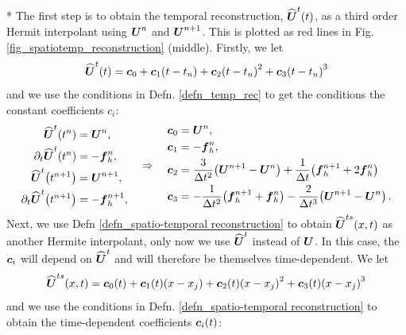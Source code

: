 \documentclass[final]{amsart}
\newcommand{\recgs}[1]{\widehat{\vec{#1}}}
\renewcommand{\vect}[1]{\geovec{#1}}
\renewcommand{\vec}[1]{\geovec{#1}}
\numberwithin{equation}{section}
\begin{document}
\/*
The first step is to obtain the temporal reconstruction,  $\widehat{\vect {U}}^t\qp{t}$, as a third order Hermit interpolant using  $\vect {U}^n$ and $\vect {U}^{n+1}$.  This is plotted as red lines in  Fig. \ref{fig_spatiotemp_reconstruction} (middle).  Firstly, we let
\begin{equation}
\widehat{\vect U}^t\qp{t}=\vect{c}_0 +\vect{c}_1\qp{t-t_n}+\vect{c}_2\qp{t-t_n}^2+\vect{c}_3\qp{t-t_n}^3
\end{equation}
and we use the conditions in Defn. \ref{defn_temp_rec}  to get the conditions the constant coefficients $c_i$:
\begin{equation}
\begin{aligned}
\recgs{U}^t\qp{t^n} &=\vect{U}^n,\\
\partial_t \widehat{\vect U}^t\qp{t^n}&=-\vect{f}^n_h,\\
\widehat{\vect U}^t\qp{t^{n+1}} &=\vect{U}^{n+1},\\
\partial_t \widehat{\vect U}^t\qp{t^{n+1}}&=-\vect{f}^{n+1}_h,
\end{aligned}\quad
\Rightarrow \quad 
\begin{aligned}
\vect{c}_0&=\vect U^n,\\
\vect{c}_1&=-\vect{f}_h^n,\\
\vect{c}_2&=\frac{3}{\Delta t^2}\qp{\vect U^{n+1}-\vect U^n}+\frac{1}{\Delta t}\qp{\vect{f}^{n+1}_h+2\vect{f}^n_h}\\
\vect{c}_3&=-\frac{1}{\Delta t^2}\qp{\vect{f}^{n+1}_h+\vect{f}^n_h}-\frac{2}{\Delta t^3}\qp{\vect U^{n+1}-\vect U^n}.\\
\end{aligned}
\end{equation}
Next, we use Defn  \ref{defn_spatio-temporal reconstruction} to obtain $\widehat{\vect U}^{ts}\qp{x,t}$ as another Hermite interpolant, only now we  use $\widehat{\vect U}^t$ instead of $\vect U$.  In this case, the $\vect{c}_i$ will depend on $\recgs{U}^t$ and will therefore be themselves time-dependent. We let
\begin{equation}
\widehat{\vect U}^{ts}\qp{x,t} =\vect{c}_0\qp{t}+\vect{c}_1\qp{t}\qp{x-x_j}+\vect{c}_2\qp{t}\qp{x-x_j}^2+\vect{c}_3\qp{t}\qp{x-x_j}^3
\end{equation}
and we use the conditions in Defn. \ref{defn_spatio-temporal reconstruction}  to obtain the time-dependent coefficients $\vect{c}_i\qp{t}$:
\end{document}
